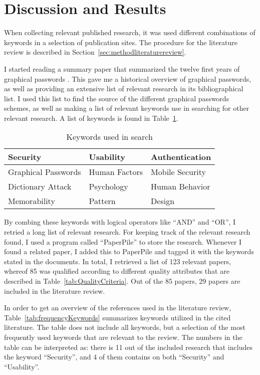 \section{Discussion and Results}\label{sec:resultsLiteratureStudy}

  When collecting relevant published research, it was used different combinations of keywords in a selection of publication sites. The procedure for the literature review is described in Section~\ref{sec:methodliteraturereview}.

  I started reading a summary paper that summarized the twelve first years of graphical passwords \cite{Biddle}. This gave me a historical overview of graphical passwords, as well as providing an extensive list of relevant research in its bibliographical list. I used this list to find the source of the different graphical passwords schemes, as well as making a list of relevant keywords use in searching for other relevant research. A list of keywords is found in Table~\ref{tab:keywords}.

    \begin{table}[H]
      \centering
      \begin{tabular}{| p{4cm} | p{3cm} | p{4cm} | }
        \hline
        Security & Usability & Authentication   \\ \hline
        Graphical Passwords & Human Factors & Mobile Security  \\ \hline
        Dictionary Attack & Psychology & Human Behavior \\ \hline
        Memorability & Pattern & Design \\ \hline
      \end{tabular}
      \caption{Keywords used in search}
      \label{tab:keywords}
    \end{table}

  By combing these keywords with logical operators like ``AND'' and ``OR'', I retried a long list of relevant research. For keeping track of the relevant research found, I used a program called ``PaperPile'' to store the research. Whenever I found a related paper, I added this to PaperPile and tagged it with the keywords stated in the documents. In total, I retrieved a list of 123 relevant papers, whereof 85 was qualified according to different quality attributes that are described in Table~\ref{tab:QualityCriteria}. Out of the 85 papers, 29 papers are included in the literature review.

  In order to get an overview of the references used in the literature review, Table~\ref{tab:frequencyKeywords} summarizes keywords utilized in the cited literature. The table does not include all keywords, but a selection of the most frequently used keywords that are relevant to the review. The numbers in the table can be interpreted as: there is 11 out of the included research that includes the keyword ``Security'', and 4 of them contains on both ``Security'' and ``Usability''. 

